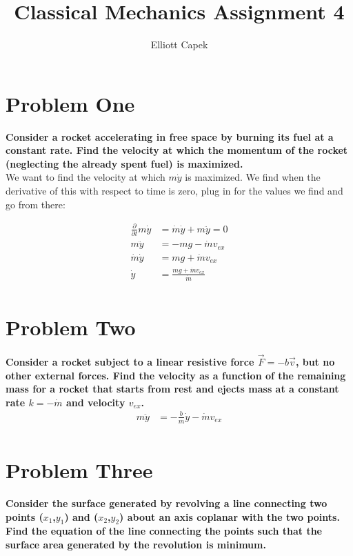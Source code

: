 \documentclass[10pt]{article} %
\title{Classical Mechanics Assignment 4}
\author{Elliott Capek}
\begin{document}
\maketitle{}

\section{Problem One}
\textbf{Consider a rocket accelerating in free space by burning its fuel at a constant rate. Find the velocity at which the momentum of the rocket (neglecting the already spent fuel) is maximized.} \\

We want to find the velocity at which $m\dot{y}$ is maximized. We find when the derivative of this with respect to time is zero, plug in for the values we find and go from there:

\begin{align*}
  \frac{\partial}{\partial t} m\dot{y} &= \dot{m}\dot{y} + m\ddot{y} = 0\\
  m\ddot{y} &= -mg - \dot{m}v_{ex}\\
  \dot{m}\dot{y} &= mg + \dot{m}v_{ex}\\
  \dot{y} &= \frac{mg + \dot{m}v_{ex}}{\dot{m}}\\
\end{align*}

\section{Problem Two}
\textbf{Consider a rocket subject to a linear resistive force $\vec{F} = -b\vec{v}$, but no other external forces. Find the velocity as a function of the remaining mass for a rocket that starts from rest and ejects mass at a constant rate $k = -\dot{m}$ and velocity $v_{ex}$.} \\

\begin{align*}
  m\ddot{y} &= -\frac{b}{m}\dot{y} - \dot{m}v_{ex}\\
\end{align*}

\section{Problem Three}
\textbf{Consider the surface generated by revolving a line connecting two points ($x_1$,$y_1$) and ($x_2$,$y_2$) about an axis coplanar with the two points.  Find the equation of the line connecting the points such that the surface area generated by the revolution is minimum.}
\end{document}
